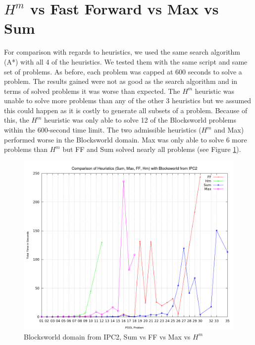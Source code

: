 \section{$H^m$ vs Fast Forward vs Max vs Sum}
For comparison with regards to heuristics, we used the same search algorithm (A*) with all 4 of the heuristics. We tested them with the same script and same set of problems. As before, each problem was capped at 600 seconds to solve a problem. The results gained were not as good as the search algorithm and in terms of solved problems it was worse than expected. The $H^m$ heuristic was unable to solve more problems than any of the other 3 heuristics but we assumed this could happen as it is costly to generate all subsets of a problem. Because of this, the $H^m$ heuristic was only able to solve 12 of the Blocksworld problems within the 600-second time limit. The two admissible heuristics ($H^m$ and Max) performed worse in the Blocksworld domain. Max was only able to solve 6 more problems than $H^m$ but FF and Sum solved nearly all problems (see Figure \ref{fig:BlocksworldDomainHeuristicCompare}). 
\begin{figure}[!htb]
    \centering
    \includegraphics[scale=0.35]{BlocksworldTimeHeuristics.png}
    \caption{Blocksworld domain from IPC2, Sum vs FF vs Max vs $H^m$}
    \label{fig:BlocksworldDomainHeuristicCompare}
\end{figure}

